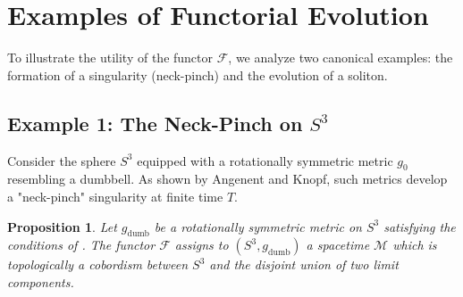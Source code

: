 \documentclass[11pt]{article}
\newtheorem{proposition}[theorem]{Proposition}
\begin{document}
\section{Examples of Functorial Evolution}

To illustrate the utility of the functor $\mathcal{F}$, we analyze two canonical examples: the formation of a singularity (neck-pinch) and the evolution of a soliton.

\subsection*{Example 1: The Neck-Pinch on $S^3$}
Consider the sphere $S^3$ equipped with a rotationally symmetric metric $g_0$ resembling a dumbbell. As shown by Angenent and Knopf, such metrics develop a "neck-pinch" singularity at finite time $T$.

\begin{proposition}
Let $g_{\mathrm{dumb}}$ be a rotationally symmetric metric on $S^3$ satisfying the conditions of \cite{AK04}. The functor $\mathcal{F}$ assigns to $(S^3, g_{\mathrm{dumb}})$ a spacetime $\mathcal{M}$ which is topologically a cobordism between $S^3$ and the disjoint union of two limit components.
\end{proposition}
\end{document}
